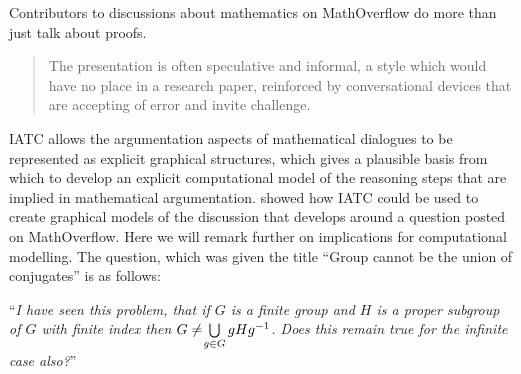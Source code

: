 \documentclass[smallextended,oneside]{svjour3}       %
\let\cite\citep
\newcommand\nothing[1]{#1}
\let\paragraph\nothing
\begin{document}
Contributors to discussions about mathematics on MathOverflow do more than just talk about proofs.
\begin{quote}
The presentation is often speculative and informal, a style which
would have no place in a research paper, reinforced by conversational
devices that are accepting of error and invite
challenge. \cite{martin2013does}
\end{quote}





\paragraph{IATC allows the argumentation aspects of mathematical dialogues to be represented as explicit graphical structures, which gives a plausible basis from which to develop an explicit computational model of the reasoning steps that are implied in mathematical argumentation.}
\paragraph{\citet{corneli2017towards} showed how IATC could be used to create graphical models of the discussion that develops around a question posted on MathOverflow.}  Here we will remark further on implications for computational modelling.
The question, which was given the title  ``Group cannot be the union of conjugates'' \cite{chandrasekhar2010group} is as follows:

\medskip

\noindent ``\emph{I have seen this problem, that if $G$ is a finite group and $H$ is a
  proper subgroup of $G$ with finite index then $ G \neq\hspace{-.2em}\bigcup\limits_{g \in G} gHg^{-1}$. Does this remain true for the
  infinite case also?}''
\end{document}
